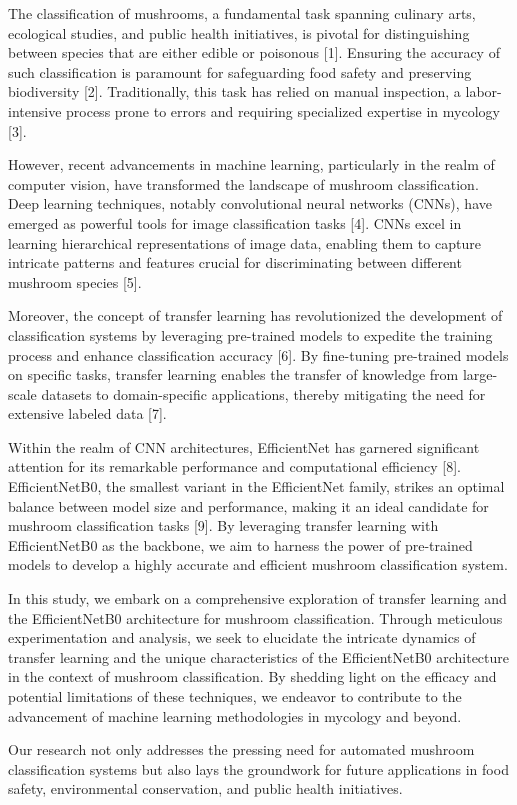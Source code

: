 The classification of mushrooms, a fundamental task spanning culinary arts, ecological studies, and public health initiatives, is pivotal for distinguishing between species that are either edible or poisonous [1]. Ensuring the accuracy of such classification is paramount for safeguarding food safety and preserving biodiversity [2]. Traditionally, this task has relied on manual inspection, a labor-intensive process prone to errors and requiring specialized expertise in mycology [3].

However, recent advancements in machine learning, particularly in the realm of computer vision, have transformed the landscape of mushroom classification. Deep learning techniques, notably convolutional neural networks (CNNs), have emerged as powerful tools for image classification tasks [4]. CNNs excel in learning hierarchical representations of image data, enabling them to capture intricate patterns and features crucial for discriminating between different mushroom species [5].

Moreover, the concept of transfer learning has revolutionized the development of classification systems by leveraging pre-trained models to expedite the training process and enhance classification accuracy [6]. By fine-tuning pre-trained models on specific tasks, transfer learning enables the transfer of knowledge from large-scale datasets to domain-specific applications, thereby mitigating the need for extensive labeled data [7].

Within the realm of CNN architectures, EfficientNet has garnered significant attention for its remarkable performance and computational efficiency [8]. EfficientNetB0, the smallest variant in the EfficientNet family, strikes an optimal balance between model size and performance, making it an ideal candidate for mushroom classification tasks [9]. By leveraging transfer learning with EfficientNetB0 as the backbone, we aim to harness the power of pre-trained models to develop a highly accurate and efficient mushroom classification system.

In this study, we embark on a comprehensive exploration of transfer learning and the EfficientNetB0 architecture for mushroom classification. Through meticulous experimentation and analysis, we seek to elucidate the intricate dynamics of transfer learning and the unique characteristics of the EfficientNetB0 architecture in the context of mushroom classification. By shedding light on the efficacy and potential limitations of these techniques, we endeavor to contribute to the advancement of machine learning methodologies in mycology and beyond.

Our research not only addresses the pressing need for automated mushroom classification systems but also lays the groundwork for future applications in food safety, environmental conservation, and public health initiatives.


